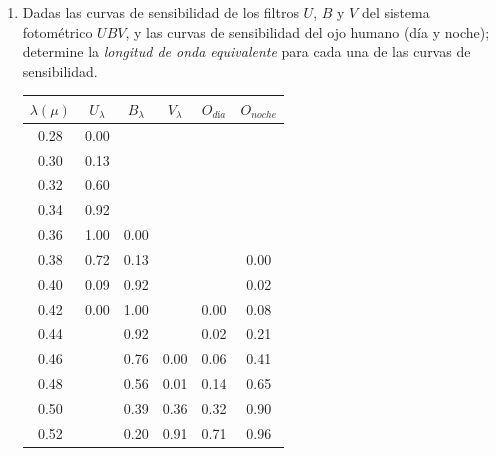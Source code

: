\documentclass[10pt,spanish,a4paper,1p]{practice}
\begin{document}
  \begin{enumerate}[wide, labelwidth=!, labelindent=0pt, label=\textbf{\textrm{\arabic*)}}, ref=\arabic*]
    \item \label{prob:1} Dadas las curvas de sensibilidad de los filtros $U$, $B$ y $V$ del sistema fotométrico $UBV$, y las curvas de sensibilidad del ojo humano (día y noche); determine la \emph{longitud de onda equivalente} para cada una de las curvas de sensibilidad.

      \begin{table}[h!]
        \centering
        \begin{tabular}{ c | c | c | c | c | c }
          $\lambda(\mu)$ & $U_\lambda$ & $B_\lambda$ & $V_\lambda$ & $O_{\textit{d\'ia}}$ & $O_{noche}$ \\\hline
          0.28           & 0.00        &             &             &                   &      \\
          0.30           & 0.13        &             &             &                   &      \\
          0.32           & 0.60        &             &             &                   &      \\
          0.34           & 0.92        &             &             &                   &      \\
          0.36           & 1.00        & 0.00        &             &                   &      \\
          0.38           & 0.72        & 0.13        &             &                   & 0.00 \\
          0.40           & 0.09        & 0.92        &             &                   & 0.02 \\
          0.42           & 0.00        & 1.00        &             & 0.00              & 0.08 \\
          0.44           &             & 0.92        &             & 0.02              & 0.21 \\
          0.46           &             & 0.76        & 0.00        & 0.06              & 0.41 \\
          0.48           &             & 0.56        & 0.01        & 0.14              & 0.65 \\
          0.50           &             & 0.39        & 0.36        & 0.32              & 0.90 \\
          0.52           &             & 0.20        & 0.91        & 0.71              & 0.96 \\

\end{tabular}
\end{table}
\end{enumerate}
\end{document}
